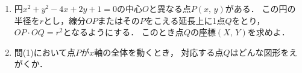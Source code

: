 \documentclass[../../main.tex]{subfiles}
\begin{document}
\begin{enumerate}
  \item 円$x^2+y^2-4x+2y+1=0$の中心$O$と異なる点$P(x, \, y)$がある．
    この円の半径を$r$とし，線分$OP$またはその$P$をこえる延長上に1点$Q$をとり，
    $OP \cdot OQ=r^2$となるようにする．
    このとき点$Q$の座標$(X, \, Y)$を求めよ．
  \item 問(1)において点$P$が$x$軸の全体を動くとき，
    対応する点$Q$はどんな図形をえがくか．
\end{enumerate}
\end{document}
